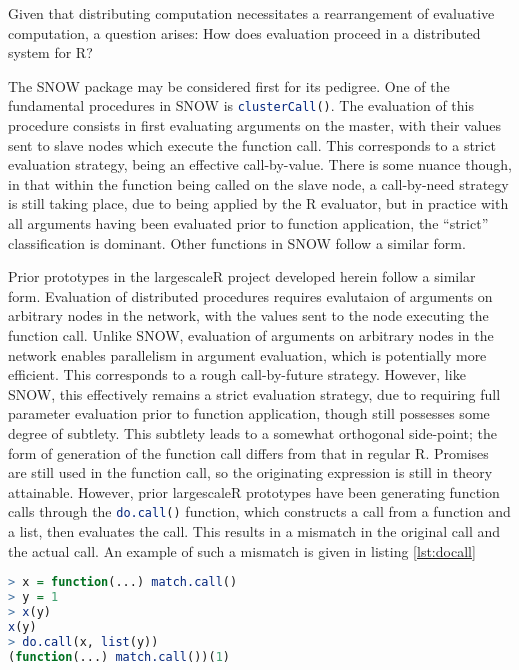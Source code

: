 \documentclass[10pt,a4paper]{article}
\begin{document}
Given that distributing computation necessitates a rearrangement of evaluative computation, a question arises: How does evaluation proceed in a distributed system for R?

The SNOW package may be considered first for its pedigree.
One of the fundamental procedures in SNOW is \lstinline[language=R]{clusterCall()}.
The evaluation of this procedure consists in first evaluating arguments on the master, with their values sent to slave nodes which execute the function call.
This corresponds to a strict evaluation strategy, being an effective call-by-value.
There is some nuance though, in that within the function being called on the slave node, a call-by-need strategy is still taking place, due to being applied by the R evaluator, but in practice with all arguments having been evaluated prior to function application, the ``strict'' classification is dominant.
Other functions in SNOW follow a similar form.

Prior prototypes in the largescaleR project developed herein follow a similar form.
Evaluation of distributed procedures requires evalutaion of arguments on arbitrary nodes in the network, with the values sent to the node executing the function call.
Unlike SNOW, evaluation of arguments on arbitrary nodes in the network enables parallelism in argument evaluation, which is potentially more efficient.
This corresponds to a rough call-by-future strategy.
However, like SNOW, this effectively remains a strict evaluation strategy, due to requiring full parameter evaluation prior to function application, though still possesses some degree of subtlety.
This subtlety leads to a somewhat orthogonal side-point; the form of generation of the function call differs from that in regular R.
Promises are still used in the function call, so the originating expression is still in theory attainable.
However, prior largescaleR prototypes have been generating function calls through the \lstinline[language=R]{do.call()} function, which constructs a call from a function and a list, then evaluates the call.
This results in a mismatch in the original call and the actual call.
An example of such a mismatch is given in listing \ref{lst:docall}

\begin{lstlisting}[language=R,float,caption={A mismatch in an actual call and one generated with do.call},label=lst:docall]
> x = function(...) match.call()
> y = 1
> x(y)
x(y)
> do.call(x, list(y))
(function(...) match.call())(1)
\end{lstlisting}
\end{document}
